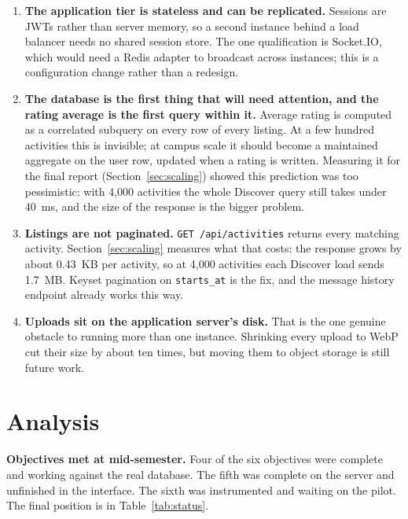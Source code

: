 \documentclass{tietreport}
\begin{document}
\begin{enumerate}
  \item \textbf{The application tier is stateless and can be replicated.} Sessions are
        JWTs rather than server memory, so a second instance behind a load balancer
        needs no shared session store. The one qualification is Socket.IO, which would
        need a Redis adapter to broadcast across instances; this is a configuration
        change rather than a redesign.

  \item \textbf{The database is the first thing that will need attention, and the
        rating average is the first query within it.} Average rating is computed as a
        correlated subquery on every row of every listing. At a few hundred activities
        this is invisible; at campus scale it should become a maintained aggregate on
        the user row, updated when a rating is written. Measuring it for the final
        report (Section~\ref{sec:scaling}) showed this prediction was too pessimistic:
        with 4{,}000 activities the whole Discover query still takes under 40~ms, and the
        size of the response is the bigger problem.

  \item \textbf{Listings are not paginated.} \texttt{GET /api/activities} returns every
        matching activity. Section~\ref{sec:scaling} measures what that costs: the
        response grows by about 0.43~KB per activity, so at 4{,}000 activities each
        Discover load sends 1.7~MB. Keyset pagination on \texttt{starts\_at} is the fix,
        and the message history endpoint already works this way.

  \item \textbf{Uploads sit on the application server's disk.} That is the one genuine
        obstacle to running more than one instance. Shrinking every upload to WebP cut
        their size by about ten times, but moving them to object storage is still
        future work.
\end{enumerate}

\section{Analysis}
\label{sec:analysis}

\noindent\textbf{Objectives met at mid-semester.} Four of the six objectives were
complete and working against the real database. The fifth was complete on the server and
unfinished in the interface. The sixth was instrumented and waiting on the pilot. The final
position is in Table~\ref{tab:status}.
\end{document}
